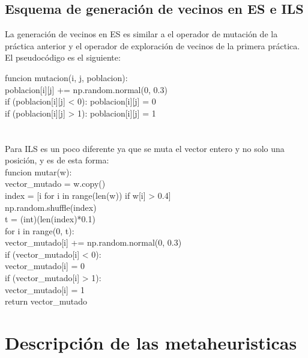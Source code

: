 \documentclass[12pt, spanish]{article}
\newcommand\tab[1][1cm]{\hspace*{#1}}
\begin{document}
\subsection{Esquema de generación de vecinos en ES e ILS}
La generación de vecinos en ES es similar a el operador de mutación de la práctica anterior y el operador de exploración de vecinos de la primera práctica. El pseudocódigo es el siguiente: 

funcion mutacion(i, j, poblacion):\\
\tab  poblacion[i][j] += np.random.normal(0, 0.3)\\
\tab  if (poblacion[i][j] < 0): poblacion[i][j] = 0\\
\tab  if (poblacion[i][j] > 1): poblacion[i][j] = 1\\
\\
\\
Para ILS es un poco diferente ya que se muta el vector entero y no solo una posición, y es de esta forma: \\
\tab funcion mutar(w):\\
\tab\tab vector_mutado = w.copy()\\
 \tab index = [i for i in range(len(w)) if w[i] > 0.4]\\
  \tab np.random.shuffle(index)\\
  \tab t = (int)(len(index)*0.1)\\
  \tab   for i in range(0, t):\\
 \tab  \tab vector_mutado[i] += np.random.normal(0, 0.3)\\
   \tab \tab if (vector_mutado[i] < 0):\\
 \tab \tab \tab vector_mutado[i] = 0\\
 \tab \tab  if (vector_mutado[i] > 1):\\
 \tab \tab \tab vector_mutado[i] = 1\\
  \tab  return vector_mutado\\

\pagebreak


\section{Descripción de las metaheuristicas}
\end{document}
